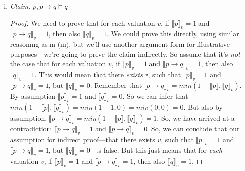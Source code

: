 \begin{enumerate}[\thesection.1]
\begin{enumerate}[(i)]
			\begin{proof}
			We need to prove that for each valuation $v$, if $\llbracket p\lor
			q\rrbracket_v=1$ and $\llbracket \neg p\rrbracket_v=1$, then also
			$\llbracket q\rrbracket_v=1$. So let $v$ be a valuation and suppose that
			$\llbracket p\lor q\rrbracket_v=1$ and $\llbracket \neg p\rrbracket_v=1$.
			Since $\llbracket \neg p\rrbracket_v=1-\llbracket p\rrbracket_v$, it
			follows that $\llbracket p\rrbracket_v=0$. We furthermore know that
			$\llbracket p\lor q\rrbracket_v=max(\llbracket p\rrbracket_v, \llbracket
			q\rrbracket_v)$. Since  $\llbracket p\rrbracket_v=0$, it follows that
			$\llbracket p\lor q\rrbracket_v=max(0, \llbracket q\rrbracket_v)$. But
			$\llbracket p\lor q\rrbracket_v=1$, by assumption, and we can only have
			$max(0, \llbracket q\rrbracket_v)=1$ if $\llbracket q\rrbracket_v=1$. So
			we can conclude that $\llbracket q\rrbracket_v=1$, as desired.
			\end{proof}
			
			\item \emph{Claim}. $p,p\to q\vDash q$
			
			\begin{proof}
			We need to prove that for each valuation $v$, if $\llbracket
			p\rrbracket_v=1$ and $\llbracket p\to q\rrbracket_v=1$, then also
			$\llbracket q\rrbracket_v=1$. We could prove this directly, using similar
			reasoning as in (iii), but we'll use another argument form for
			illustrative purposes---we're going to prove the claim indirectly. So
			assume that it's \emph{not} the case that for each valuation $v$, if
			$\llbracket p\rrbracket_v=1$ and $\llbracket p\to q\rrbracket_v=1$, then
			also $\llbracket q\rrbracket_v=1$. This would mean that there
			\emph{exists} $v$, such that  $\llbracket p\rrbracket_v=1$ and
			$\llbracket p\to q\rrbracket_v=1$, but $\llbracket q\rrbracket_v=0$.
			Remember that $\llbracket p\to q\rrbracket_v=min(1-\llbracket
			p\rrbracket, \llbracket q\rrbracket_v)$. By assumption $\llbracket
			p\rrbracket_v=1$ and $\llbracket q\rrbracket_v=0$. So we can infer that
			$min(1-\llbracket p\rrbracket, \llbracket q\rrbracket_v)=min(1-1,
			0)=min(0, 0)=0$. But also by assumption, $\llbracket p\to
			q\rrbracket_v=min(1-\llbracket p\rrbracket, \llbracket q\rrbracket_v)=1$.
			So, we have arrived at a contradiction: $\llbracket p\to q\rrbracket_v=1$
			and $\llbracket p\to q\rrbracket_v=0$. So, we can conclude that our
			assumption for indirect proof---that there exists $v$, such that
			$\llbracket p\rrbracket_v=1$ and $\llbracket p\to q\rrbracket_v=1$, but
			$\llbracket q\rrbracket_v=0$---is false. But this just means that for
			\emph{each} valuation $v$, if $\llbracket p\rrbracket_v=1$ and
			$\llbracket p\to q\rrbracket_v=1$, then also $\llbracket
			q\rrbracket_v=1$.
			\end{proof}
			

\end{enumerate}
\end{enumerate}
